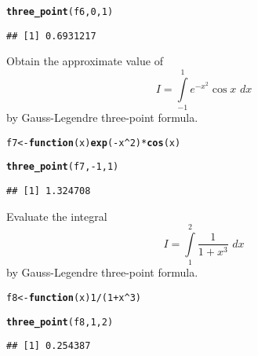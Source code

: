 \documentclass[11pt, a4paper]{article}\usepackage[]{graphicx}\usepackage[]{xcolor}
\makeatletter
\newcommand{\hlnum}[1]{\textcolor[rgb]{0.686,0.059,0.569}{#1}}%
\newcommand{\hlopt}[1]{\textcolor[rgb]{0,0,0}{#1}}%
\newcommand{\hldef}[1]{\textcolor[rgb]{0.345,0.345,0.345}{#1}}%
\newcommand{\hlkwa}[1]{\textcolor[rgb]{0.161,0.373,0.58}{\textbf{#1}}}%
\newcommand{\hlkwb}[1]{\textcolor[rgb]{0.69,0.353,0.396}{#1}}%
\newcommand{\hlkwc}[1]{\textcolor[rgb]{0.333,0.667,0.333}{#1}}%
\newcommand{\hlkwd}[1]{\textcolor[rgb]{0.737,0.353,0.396}{\textbf{#1}}}%
\newenvironment{kframe}{%
 \def\at@end@of@kframe{}%
 \ifinner\ifhmode%
  \def\at@end@of@kframe{\end{minipage}}%
  \begin{minipage}{\columnwidth}%
 \fi\fi%
 \def\FrameCommand##1{\hskip\@totalleftmargin \hskip-\fboxsep
 \colorbox{shadecolor}{##1}\hskip-\fboxsep
     \hskip-\linewidth \hskip-\@totalleftmargin \hskip\columnwidth}%
 \MakeFramed {\advance\hsize-\width
   \@totalleftmargin\z@ \linewidth\hsize
   \@setminipage}}%
 {\par\unskip\endMakeFramed%
 \at@end@of@kframe}
\newenvironment{knitrout}{}{} %
\makeatother
\begin{document}
\begin{knitrout}
\color{fgcolor}\begin{kframe}
\begin{alltt}
\hlkwd{three_point}\hldef{(f6,} \hlnum{0}\hldef{,} \hlnum{1}\hldef{)}
\end{alltt}
\begin{verbatim}
## [1] 0.6931217
\end{verbatim}
\end{kframe}
\end{knitrout}

\leftpointright \hspace{0.5cm} Obtain the approximate value of $$I = \int \limits_{-1}^{1} e^{-x^2} \cos x \,\, dx$$ by Gauss-Legendre three-point formula.

\begin{knitrout}
\color{fgcolor}\begin{kframe}
\begin{alltt}
\hldef{f7} \hlkwb{<-} \hlkwa{function}\hldef{(}\hlkwc{x}\hldef{)} \hlkwd{exp}\hldef{(}\hlopt{-}\hldef{x}\hlopt{^}\hlnum{2}\hldef{)} \hlopt{*} \hlkwd{cos}\hldef{(x)}

\hlkwd{three_point}\hldef{(f7,} \hlopt{-}\hlnum{1}\hldef{,} \hlnum{1}\hldef{)}
\end{alltt}
\begin{verbatim}
## [1] 1.324708
\end{verbatim}
\end{kframe}
\end{knitrout}

\leftpointright \hspace{0.5cm} Evaluate the integral $$I = \int \limits_{1}^{2} \dfrac{1}{1 + x^3} \,\, dx$$ by Gauss-Legendre three-point formula.

\begin{knitrout}
\color{fgcolor}\begin{kframe}
\begin{alltt}
\hldef{f8} \hlkwb{<-} \hlkwa{function}\hldef{(}\hlkwc{x}\hldef{)} \hlnum{1} \hlopt{/} \hldef{(}\hlnum{1} \hlopt{+} \hldef{x}\hlopt{^}\hlnum{3}\hldef{)}

\hlkwd{three_point}\hldef{(f8,} \hlnum{1}\hldef{,} \hlnum{2}\hldef{)}
\end{alltt}
\begin{verbatim}
## [1] 0.254387
\end{verbatim}
\end{kframe}
\end{knitrout}
\end{document}
